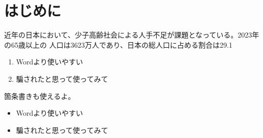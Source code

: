 \section{はじめに}
近年の日本において、少子高齢社会による人手不足が課題となっている。2023年の65歳以上の
人口は3623万人であり、日本の総人口に占める割合は29.1



\begin{enumerate}
  \item Wordより使いやすい
  \item 騙されたと思って使ってみて
\end{enumerate}

箇条書きも使えるよ。

\begin{itemize}
  \item Wordより使いやすい
  \item 騙されたと思って使ってみて
\end{itemize}